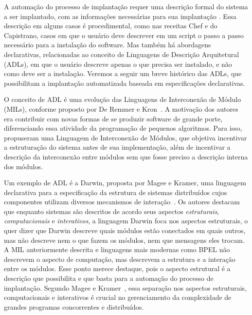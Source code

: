 A automação do processo de implantação requer uma descrição formal do sistema a ser implantado, com as informações necessárias para sua implantação . Essa descrição em alguns casos é procedimental, como nas receitas Chef e do Capistrano, casos em que o usuário deve descrever em um script o passo a passo necessário para a instalação do software. Mas também há abordagens declarativas, relacionadas ao conceito de Linguagens de Descrição Arquitetural (ADLs), em que o usuário descreve apenas o que precisa ser instalado, e não como deve ser a instalação. Veremos a seguir um breve histórico das ADLs, que possibilitam a implantação automatizada baseada em especificações declarativas.

O conceito de ADL é uma evolução das Linguagens de Interconexão de Módulo (MILs), conforme proposto por De Remmer e Kron~\cite{DeRemer1976Programming}. A motivação dos autores era contribuir com novas formas de se produzir software de grande porte, diferenciando essa atividade da programação de pequenos algoritmos. Para isso, propuseram uma Linguagem de Interconexão de Módulos, que objetiva incentivar a estruturação do sistema antes de sua implementação, além de incentivar a descrição da interconexão entre módulos sem que fosse preciso a descrição interna dos módulos. 

Um exemplo de ADL é a Darwin, proposta por Magee e Kramer, uma linguagem declarativa para a especificação da estrutura de sistemas distribuídos cujos componentes utilizam diversos mecanismos de interação~\cite{Magee1996Dynamic}. Os autores destacam que enquanto sistemas são descritos de acordo seus aspectos \emph{estruturais}, \emph{computacionais} e \emph{interativos}, a linguagem Darwin foca nos aspectos estruturais, o quer dizer que Darwin descreve quais módulos estão conectados em quais outros, mas não descreve nem o que fazem os módulos, nem que mensagens eles trocam. A MIL anteriormente descrita e linguagens mais modernas como BPEL não descrevem o aspecto de computação, mas descrevem a estrutura e a interação entre os módulos. Esse ponto merece destaque, pois o aspecto estrutural é a descrição que possibilita e que basta para a automação do processo de implantação. Segundo Magee e Kramer~\cite{Magee1994Regis}, essa separação nos aspectos estruturais, computacionais e interativos é crucial no gerenciamento da complexidade de grandes programas concorrentes e distribuídos.

